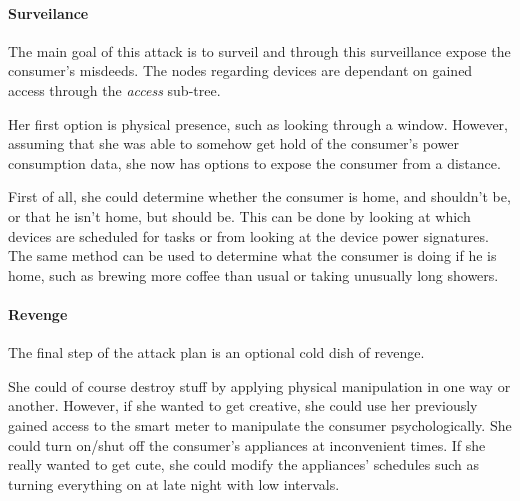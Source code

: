 \paragraph{Surveilance}
The main goal of this attack is to surveil and through this surveillance expose the consumer's misdeeds.
The nodes regarding devices are dependant on gained access through the \textit{access} sub-tree.

Her first option is physical presence, such as looking through a window.
However, assuming that she was able to somehow get hold of the consumer's power consumption data, she now has options to expose the consumer from a distance.

First of all, she could determine whether the consumer is home, and shouldn't be, or that he isn't home, but should be.
This can be done by looking at which devices are scheduled for tasks or from looking at the device power signatures.
The same method can be used to determine what the consumer is doing if he is home, such as brewing more coffee than usual or taking unusually long showers.

\paragraph{Revenge}
The final step of the attack plan is an optional cold dish of revenge.

She could of course destroy stuff by applying physical manipulation in one way or another.
However, if she wanted to get creative, she could use her previously gained access to the smart meter to manipulate the consumer psychologically.
She could turn on/shut off the consumer's appliances at inconvenient times.
If she really wanted to get cute, she could modify the appliances' schedules such as turning everything on at late night with low intervals.
